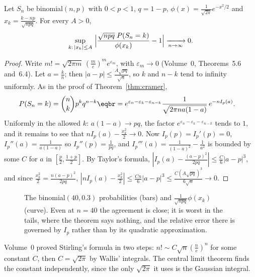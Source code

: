 \begin{theorem}\label{thm:local}
Let $S_n$ be binomial$(n,p)$ with $0<p<1$, $q=1-p$, $\phi(x)=\frac1{\sqrt{2\pi}}e^{-x^2/2}$ and $x_k=\frac{k-np}{\sqrt{npq}}$. For every $A>0$,
\[
\sup_{k:\,|x_k|\le A}\ \Bigl|\frac{\sqrt{npq}\;P(S_n=k)}{\phi(x_k)}-1\Bigr|\xrightarrow[n\to\infty]{}0.
\]
\end{theorem}
\begin{proof}
Write $m!=\sqrt{2\pi m}\,(\frac me)^me^{\varepsilon_m}$, with $\varepsilon_m\to0$ (Volume~0, Theorems~5.6 and~6.4). Let $a=\frac kn$; then $|a-p|\le\frac{A\sqrt{pq}}{\sqrt n}$, so $k$ and
$n-k$ tend to infinity uniformly. As in the proof of Theorem~\ref{thm:cramer},
\[
\begin{aligned}P(S_n=k)&=\binom nkp^kq^{n-k}\eqbr=e^{\varepsilon_n-\varepsilon_k-\varepsilon_{n-k}}\frac1{\sqrt{2\pi na(1-a)}}\,e^{-nI_p(a)}.\end{aligned}
\]
Uniformly in the allowed $k$: $a(1-a)\to pq$, the factor $e^{\varepsilon_n-\varepsilon_k-\varepsilon_{n-k}}$ tends to $1$, and it remains to see that $nI_p(a)-\frac{x_k^2}2\to0$.
Now $I_p(p)=I_p'(p)=0$, $I_p''(a)=\frac1{a(1-a)}$ so $I_p''(p)=\frac1{pq}$, and $I_p'''(a)=\frac1{(1-a)^2}-\frac1{a^2}$ is bounded by some $C$ for $a$ in $[\frac p2,\frac{1+p}2]$. By
Taylor's formula, $|I_p(a)-\frac{(a-p)^2}{2pq}|\le\frac C6|a-p|^3$, and since $\frac{x_k^2}2=\frac{n(a-p)^2}{2pq}$,
$|nI_p(a)-\frac{x_k^2}2|\le\frac{Cn}6|a-p|^3\le\frac{C(A\sqrt{pq})^3}{6\sqrt n}\to0$.
\end{proof}

\begin{figure}[ht]
\centering
{}
\caption{The binomial$(40,0.3)$ probabilities (bars) and $\frac1{\sqrt{npq}}\phi(x_k)$ (curve). Even at $n=40$ the agreement is close; it is worst in the
tails, where the theorem says nothing, and the relative error there is governed by $I_p$ rather than by its quadratic
approximation.}
\label{fig:local}
\end{figure}

Volume~0 proved Stirling's formula in two steps: $n!\sim C\sqrt n(\frac ne)^n$ for some constant $C$, then $C=\sqrt{2\pi}$ by Wallis' integrals.
The central limit theorem finds the constant independently, since the only $\sqrt{2\pi}$ it uses is the Gaussian
integral.

